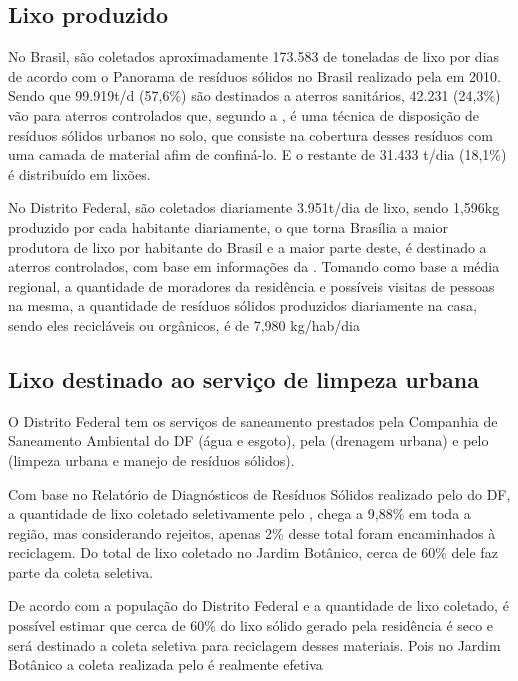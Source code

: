 \subsection{Lixo produzido}

	No Brasil, são coletados aproximadamente 173.583 de toneladas de lixo por dias de acordo com o Panorama de resíduos sólidos no Brasil realizado pela \cite{ABRELPE} em 2010. Sendo que 99.919t/d (57,6\%) são destinados a aterros sanitários, 42.231 (24,3\%) vão para aterros controlados que, segundo a \cite{NBR8849:1985}, é uma técnica de disposição de resíduos sólidos urbanos no solo, que consiste na cobertura desses resíduos com uma camada de material afim de confiná-lo. E o restante de 31.433 t/dia (18,1\%) é distribuído em lixões.

	No Distrito Federal, são coletados diariamente 3.951t/dia de lixo, sendo 1,596kg produzido por cada habitante diariamente, o que torna Brasília a maior produtora de lixo por habitante do Brasil e a maior parte deste, é destinado a aterros controlados, com base em informações da \cite{ABRELPE}. Tomando como base a média regional, a quantidade de moradores da residência e possíveis visitas de pessoas na mesma, a quantidade de resíduos sólidos produzidos diariamente na casa, sendo eles recicláveis ou orgânicos, é de 7,980 kg/hab/dia

\subsection{Lixo destinado ao serviço de limpeza urbana}

	O Distrito Federal tem os serviços de saneamento prestados pela Companhia de Saneamento Ambiental do DF\cite{CAESB} (água e esgoto), pela \cite{Novacap} (drenagem urbana) e pelo \cite{SLU} (limpeza urbana e manejo de resíduos sólidos).

	Com base no Relatório de Diagnósticos de Resíduos Sólidos realizado pelo \cite{SLU} do DF, a quantidade de lixo coletado seletivamente pelo \cite{SLU}, chega a 9,88\% em toda a região, mas considerando rejeitos, apenas 2\% desse total foram encaminhados à reciclagem. Do total de lixo coletado no Jardim Botânico, cerca de 60\% dele faz parte da coleta seletiva.

	De acordo com a população do Distrito Federal e a quantidade de lixo coletado, é possível estimar que cerca de 60\% do lixo sólido gerado pela residência é seco e será destinado a coleta seletiva para reciclagem desses materiais. Pois no Jardim Botânico a coleta realizada pelo \cite{SLU} é realmente efetiva

